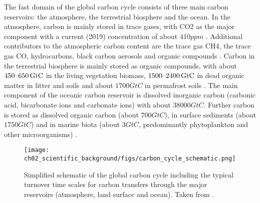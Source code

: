 The fast domain of the global carbon cycle consists of three main carbon
reservoirs: the atmosphere, the terrestrial biosphere and the ocean. In the
atmosphere, carbon is mainly stored in trace gases, with \ac{CO2} as the major
component with a current (2019) concentration of about $410 \unit{ppm}$
\autocite{Friedlingstein2019}. Additional contributors to the atmospheric
carbon content are the trace gas \ac{CH4}, the trace gas \ac{CO}, hydrocarbons,
black carbon aerosols and organic compounds \autocite{Ciais2013}. Carbon in the
terrestrial biosphere is mainly stored as organic compounds, with about
$\range{450}{650} \unit{GtC}$ in the living vegetation biomass,
$\range{1500}{2400} \unit{GtC}$ in dead organic matter in litter and soils and
about $1700 \unit{GtC}$ in permafrost soils \autocite{Ciais2013}. The main
component of the oceanic carbon reservoir is dissolved inorganic carbon
(carbonic acid, bicarbonate ions and carbonate ions) with about $38000
\unit{GtC}$. Further carbon is stored as dissolved organic carbon (about $700
\unit{GtC}$), in surface sediments (about $1750 \unit{GtC}$) and in marine
biota (about $3 \unit{GtC}$, predominantly phytoplankton and other
microorganisms) \autocite{Ciais2013, Friedlingstein2019}.

\begin{figure}[t]
  \centering
  \texttt{[image: 
    ch02\_scientific\_background/figs/carbon\_cycle\_schematic.png]}
  \caption{Simplified schematic of the global carbon cycle including the
    typical turnover time scales for carbon transfers through the major
    reservoirs (atmosphere, land surface and ocean). Taken from
    \textcite{Ciais2013}.}
  \label{fig:02:carbon_cycle_schematic}
\end{figure}

